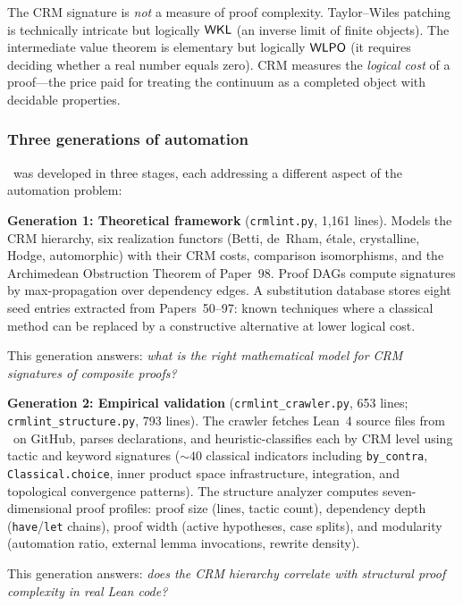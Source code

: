 The CRM signature is \emph{not} a measure of proof complexity.
Taylor--Wiles patching is technically intricate but logically $\textsf{WKL}$
(an inverse limit of finite objects).  The intermediate value theorem
is elementary but logically $\textsf{WLPO}$ (it requires deciding whether a
real number equals zero).  CRM measures the \emph{logical cost} of a
proof---the price paid for treating the continuum as a completed object
with decidable properties.

\subsubsection{Three generations of automation}\label{sec:three-gen}

\CRMlint\ was developed in three stages, each addressing a different
aspect of the automation problem:

\medskip
\noindent\textbf{Generation 1: Theoretical framework}
(\texttt{crmlint.py}, 1{,}161 lines).
Models the CRM hierarchy, six realization functors (Betti, de~Rham,
\'etale, crystalline, Hodge, automorphic) with their CRM costs,
comparison isomorphisms, and the Archimedean Obstruction Theorem of
Paper~98.  Proof DAGs compute signatures by max-propagation over
dependency edges.  A substitution database stores eight seed entries
extracted from Papers~50--97: known techniques where a classical method
can be replaced by a constructive alternative at lower logical cost.

This generation answers: \emph{what is the right mathematical model
for CRM signatures of composite proofs?}

\medskip
\noindent\textbf{Generation 2: Empirical validation}
(\texttt{crmlint\_crawler.py}, 653 lines;
\texttt{crmlint\_structure.py}, 793 lines).
The crawler fetches Lean~4 source files from \Mathlib\ on GitHub,
parses declarations, and heuristic-classifies each by CRM level using
tactic and keyword signatures (${\sim}40$ classical indicators including
\texttt{by\_contra}, \texttt{Classical.choice}, inner product space
infrastructure, integration, and topological convergence patterns).
The structure analyzer computes seven-dimensional proof profiles:
proof size (lines, tactic count), dependency depth (\texttt{have}/\texttt{let}
chains), proof width (active hypotheses, case splits), and modularity
(automation ratio, external lemma invocations, rewrite density).

This generation answers: \emph{does the CRM hierarchy correlate with
structural proof complexity in real Lean code?}

